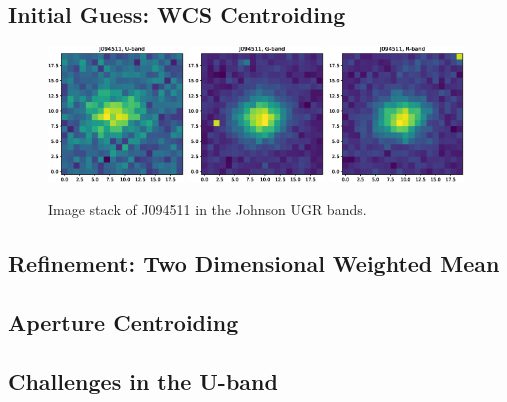 \documentclass[a4paper,11pt]{article}
\begin{document}
\subsection{Initial Guess: WCS Centroiding}

\begin{figure}[h!]
    \includegraphics[width=0.32\textwidth]{wcs_centroid_U_stack.eps}
    \includegraphics[width=0.32\textwidth]{wcs_centroid_G_stack.eps}
    \includegraphics[width=0.32\textwidth]{wcs_centroid_R_stack.eps}
    \caption{Image stack of J094511 in the Johnson UGR bands.}
    \label{fig:wcs_centroids}
\end{figure}

\subsection{Refinement: Two Dimensional Weighted Mean}
\subsection{Aperture Centroiding}
\subsection{Challenges in the U-band}
\end{document}
